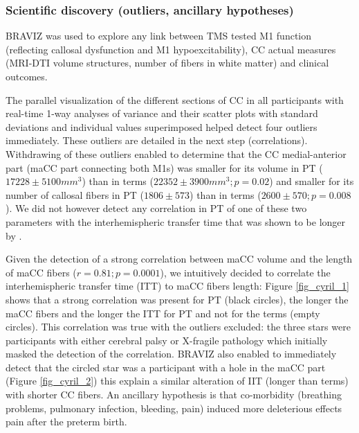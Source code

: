 \documentclass[twocolumn]{svjour3}
\begin{document}
\subsubsection{Scientific discovery (outliers, ancillary hypotheses)}

BRAVIZ was used to explore any link between TMS tested M1 function (reflecting callosal dysfunction and M1 hypoexcitability), CC actual measures (MRI-DTI volume structures, number of fibers in white matter) and clinical outcomes. 

The parallel visualization of the different sections of CC in all participants with real-time 1-way analyses of variance and their scatter plots with standard deviations and individual values superimposed helped detect four outliers immediately. These outliers are detailed in the next step (correlations). Withdrawing of these outliers enabled to determine that the CC medial-anterior part (maCC part connecting both M1s) was smaller for its volume in PT ($17228 \pm 5100 mm^3$) than in terms ($22352 \pm 3900 mm^3; p=0.02$) and smaller for its number of callosal fibers in PT ($1806 \pm 573$) than in terms ($2600 \pm 570; p=0.008$). We did not however detect any correlation in PT of one of these two parameters with the interhemispheric transfer time that was shown to be longer by \cite{schneider_cerebral_2012}. 


Given the detection of a strong correlation between maCC volume and the length of maCC fibers ($r=0.81; p=0.0001$), we intuitively decided to correlate the interhemispheric transfer time (ITT) to maCC fibers length: Figure \ref{fig_cyril_1} shows that a strong correlation was present for PT (black circles), the longer the maCC fibers and the longer the ITT for PT and not for the terms (empty circles). This correlation was true with the outliers excluded: the three stars were participants with either cerebral palsy or X-fragile pathology which initially masked the detection of the correlation. BRAVIZ also enabled to immediately detect that the circled star was a participant with a hole in the maCC part (Figure \ref{fig_cyril_2}) this explain a similar alteration of IIT (longer than terms) with shorter CC fibers. An ancillary hypothesis is that co-morbidity (breathing problems, pulmonary infection, bleeding, pain) induced more deleterious effects pain after the preterm birth.
\end{document}

